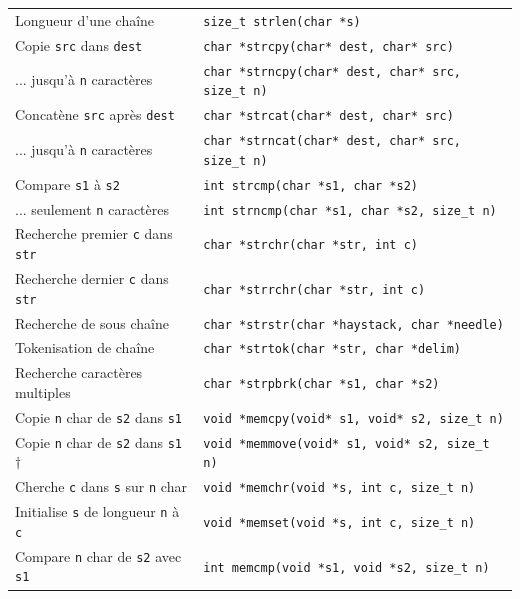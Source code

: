 \documentclass{article}
\newcommand{\cd}{\lstinline}
\begin{document}
\begin{multicols*}{3}
\begin{tabularx}{\linewidth}{Xl}
  Longueur d'une chaîne & \cd{size_t strlen(char *s)} \\
  Copie \texttt{src} dans \texttt{dest} & \cd{char *strcpy(char* dest, char* src)} \\
   ... jusqu'à \texttt{n} caractères & \cd{char *strncpy(char* dest, char* src, size_t n)} \\
  \hline
  Concatène \texttt{src} après \texttt{dest} & \cd{char *strcat(char* dest, char* src)} \\
   ... jusqu'à \texttt{n} caractères & \cd{char *strncat(char* dest, char* src, size_t n)} \\
  Compare \texttt{s1} à \texttt{s2} & \cd{int strcmp(char *s1, char *s2)} \\
   ... seulement \texttt{n} caractères & \cd{int strncmp(char *s1, char *s2, size_t n)} \\
  \hline
  Recherche premier \texttt{c} dans \texttt{str} & \cd{char *strchr(char *str, int c)} \\
  Recherche dernier \texttt{c} dans \texttt{str} & \cd{char *strrchr(char *str, int c)} \\
  Recherche de sous chaîne & \cd{char *strstr(char *haystack, char *needle)} \\
  Tokenisation de chaîne & \cd{char *strtok(char *str, char *delim)} \\
  Recherche caractères multiples & \cd{char *strpbrk(char *s1, char *s2)} \\
  \hline
  Copie \texttt{n} char de \texttt{s2} dans \texttt{s1} & \cd{void *memcpy(void* s1, void* s2, size_t n)} \\
  Copie \texttt{n} char de \texttt{s2} dans \texttt{s1} $\dagger$ & \cd{void *memmove(void* s1, void* s2, size_t n)} \\
  Cherche \texttt{c} dans \texttt{s} sur \texttt{n} char & \cd{void *memchr(void *s, int c, size_t n)} \\
  Initialise \texttt{s} de longueur \texttt{n} à \texttt{c} & \cd{void *memset(void *s, int c, size_t n)} \\
  Compare \texttt{n} char de \texttt{s2} avec \texttt{s1} & \cd{int memcmp(void *s1, void *s2, size_t n)} \\
\end{tabularx}


\end{multicols*}
\end{document}
